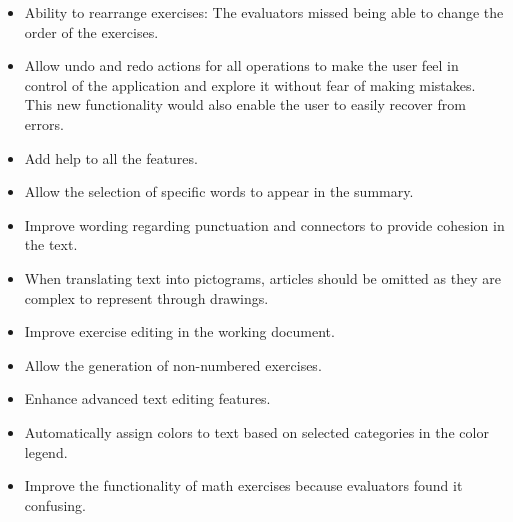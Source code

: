 \begin{itemize}
    \item Ability to rearrange exercises: The evaluators missed being able to change the order of the exercises.
    \item Allow undo and redo actions for all operations to make the user feel in control of the application and explore it without fear of making mistakes. This new functionality would also enable the user to easily recover from errors.
    \item Add help to all the features.
    \item Allow the selection of specific words to appear in the summary.
    \item Improve wording regarding punctuation and connectors to provide cohesion in the text.
    \item When translating text into pictograms, articles should be omitted as they are complex to represent through drawings.
    \item Improve exercise editing in the working document.
    \item Allow the generation of non-numbered exercises.
    \item Enhance advanced text editing features.
    \item Automatically assign colors to text based on selected categories in the color legend.
    \item Improve the functionality of math exercises because evaluators found it confusing.
\end{itemize}